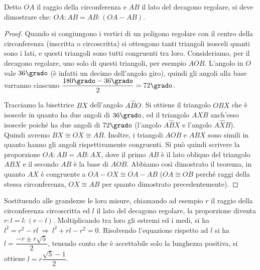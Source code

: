Detto $OA$ il raggio della circonferenza e $AB$ il lato del decagono 
regolare, si deve dimostrare che: $OA:AB=AB:(OA-AB)$.

\begin{figure*}[!htb]
	\begin{center}
		\begin{minipage}{0.45\textwidth}
			\centering
			
		\end{minipage}
		\hspace{0.03\textwidth}	
		\begin{minipage}{0.45\textwidth}
			\centering
			
		\end{minipage}
	\end{center}
\end{figure*}

\begin{proof}
Quando si congiungono i vertici di un poligono regolare con il centro 
della circonferenza (inscritta o circoscritta) si ottengono tanti 
triangoli isosceli quanti sono i lati, e questi triangoli sono tutti 
congruenti tra loro.
Consideriamo, per il decagono regolare, uno solo di questi triangoli, 
per esempio $AOB$. L'angolo in $O$ vale $36\grado$ (è infatti un 
decimo dell'angolo giro), quindi gli angoli alla base varranno 
ciascuno $\dfrac{180\grado-36\grado}{2} = 72\grado$.

Tracciamo la bisettrice $BX$ dell'angolo $A\widehat{B}O$. Si ottiene 
il triangolo $OBX$ che è isoscele in quanto ha due angoli di 
$36\grado$, ed il triangolo $AXB$ anch'esso isoscele poiché ha due 
angoli di $72\grado$ (l'angolo $A\widehat{B}X$ e l'angolo 
$A\widehat{X}B$).  
Quindi avremo $BX\cong OX\cong AB$.
Inoltre, i triangoli $AOB$ e $ABX$ sono simili in quanto hanno gli 
angoli rispettivamente congruenti.
Si può quindi scrivere la proporzione $OA:AB=AB:AX$, dove il primo 
$AB$ è il lato obliquo del triangolo $ABX$ e il secondo $AB$ è la 
base di $AOB$.
Abbiamo così dimostrato il teorema, in quanto $AX$ è congruente a 
$OA-OX \cong OA-AB$ ($OA\cong OB$ perché raggi della stessa 
circonferenza, $OX\cong AB$ per quanto dimostrato precedentemente).
\end{proof}

Sostituendo alle grandezze le loro misure, chiamando ad esempio $r$ 
il raggio della circonferenza circoscritta ed $l$ il lato del 
decagono regolare, la proporzione diventa $r:l=l:(r-l)$.
Moltiplicando tra loro gli estremi ed i medi, si ha $l^2=r^2-rl 
\:\Rightarrow\: l^2+rl-r^2=0$.
Risolvendo l'equazione rispetto ad $l$ si ha $l=\dfrac{-r\pm 
r\sqrt{5}}{2}$, tenendo conto che è accettabile solo la lunghezza 
positiva, si ottiene $l=r\dfrac{\sqrt{5}-1}{2}$.

